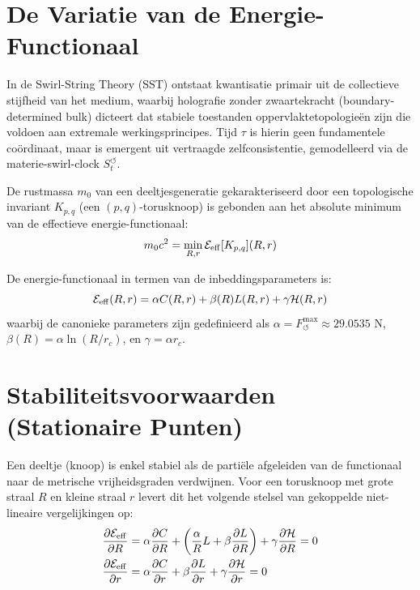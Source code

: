 \documentclass[12pt,a4paper]{article}
\begin{document}
                
                \section{De Variatie van de Energie-Functionaal}
                    
                    In de Swirl-String Theory (SST) ontstaat kwantisatie primair uit de collectieve stijfheid van het medium, waarbij holografie zonder zwaartekracht (boundary-determined bulk) dicteert dat stabiele toestanden oppervlaktetopologie\"en zijn die voldoen aan extremale werkingsprincipes. Tijd $\tau$ is hierin geen fundamentele co\"ordinaat, maar is emergent uit vertraagde zelfconsistentie, gemodelleerd via de materie-swirl-clock $S_t^{\boldsymbol{\circlearrowleft}}$.
                    
                    De rustmassa $m_0$ van een deeltjesgeneratie gekarakteriseerd door een topologische invariant $K_{p,q}$ (een $(p,q)$-torusknoop) is gebonden aan het absolute minimum van de effectieve energie-functionaal:
                    \begin{equation}
                        m_0 c^2 = \min_{R, r} \mathcal{E}_{\rm eff}[K_{p,q}](R, r)
                    \end{equation}
                    
                    De energie-functionaal in termen van de inbeddingsparameters is:
                    \begin{equation}
                        \mathcal{E}_{\rm eff}(R, r) = \alpha C(R, r) + \beta(R) L(R, r) + \gamma \mathcal{H}(R, r)
                    \end{equation}
                    waarbij de canonieke parameters zijn gedefinieerd als $\alpha = F_{\!\boldsymbol{\circlearrowleft}}^{\max} \approx 29.0535 \text{ N}$, $\beta(R) = \alpha \ln(R/r_c)$, en $\gamma = \alpha r_c$.
                
                \section{Stabiliteitsvoorwaarden (Stationaire Punten)}
                    
                    Een deeltje (knoop) is enkel stabiel als de parti\"ele afgeleiden van de functionaal naar de metrische vrijheidsgraden verdwijnen. Voor een torusknoop met grote straal $R$ en kleine straal $r$ levert dit het volgende stelsel van gekoppelde niet-lineaire vergelijkingen op:
                    \begin{align}
                        \frac{\partial \mathcal{E}_{\rm eff}}{\partial R} &= \alpha \frac{\partial C}{\partial R} + \left( \frac{\alpha}{R} L + \beta \frac{\partial L}{\partial R} \right) + \gamma \frac{\partial \mathcal{H}}{\partial R} = 0 \label{eq:opt_R} \\
                        \frac{\partial \mathcal{E}_{\rm eff}}{\partial r} &= \alpha \frac{\partial C}{\partial r} + \beta \frac{\partial L}{\partial r} + \gamma \frac{\partial \mathcal{H}}{\partial r} = 0 \label{eq:opt_r}
                    \end{align}
                    
\end{document}
